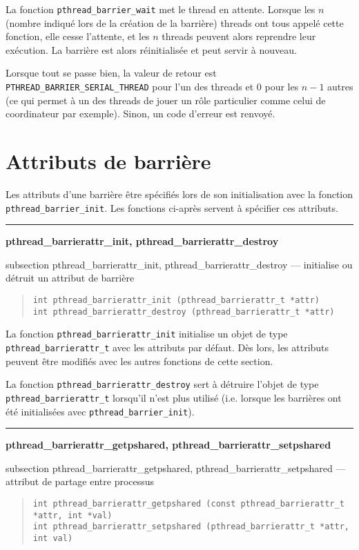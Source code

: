 \documentclass [twoside] {report}
\newcommand {\primitive} [1]
    {
	{\large \bf #1}
	\addcontentsline {toc} {subsection} {#1}
    }
\newcommand {\separation}
    {
	\vspace {7mm}
	\nopagebreak
	\hrule
    }
\begin{document}
La fonction \verb|pthread_barrier_wait| met le thread en attente. Lorsque
les $n$ (nombre indiqué lors de la création de la barrière) threads
ont tous appelé cette fonction, elle cesse l'attente, et les $n$
threads peuvent alors reprendre leur exécution. La barrière est alors
réinitialisée et peut servir à nouveau.

Lorsque tout se passe bien, la valeur de retour est
\verb|PTHREAD_BARRIER_SERIAL_THREAD| pour l'un des threads et 0 pour
les $n-1$ autres (ce qui permet à un des threads de jouer un rôle
particulier comme celui de coordinateur par exemple). Sinon, un code
d'erreur est renvoyé.


\section {Attributs de barrière}

Les attributs d'une barrière être spécifiés lors de son initialisation
avec la fonction \verb|pthread_barrier_init|. Les fonctions ci-après
servent à spécifier ces attributs.

\separation
\primitive {pthread\_barrierattr\_init, pthread\_barrierattr\_destroy} ---
initialise ou détruit un attribut de barrière

\begin {quote}
\begin {verbatim}
int pthread_barrierattr_init (pthread_barrierattr_t *attr)
int pthread_barrierattr_destroy (pthread_barrierattr_t *attr)
\end{verbatim}
\end {quote}

La fonction \verb|pthread_barrierattr_init| initialise un objet de type
\verb|pthread_barrierattr_t| avec les attributs par défaut. Dès lors,
les attributs peuvent être modifiés avec les autres fonctions de
cette section.

La fonction \verb|pthread_barrierattr_destroy| sert à détruire
l'objet de type \verb|pthread_barrierattr_t| lorsqu'il n'est plus
utilisé (i.e.  lorsque les barrières ont été initialisées avec
\verb|pthread_barrier_init|).


\separation
\primitive {pthread\_barrierattr\_getpshared, pthread\_barrierattr\_setpshared} --- attribut de partage entre processus

\begin {quote}
\begin {verbatim}
int pthread_barrierattr_getpshared (const pthread_barrierattr_t *attr, int *val)
int pthread_barrierattr_setpshared (pthread_barrierattr_t *attr, int val)
\end{verbatim}
\end {quote}
\end{document}
